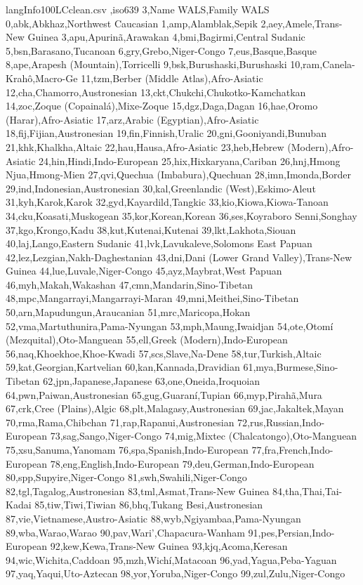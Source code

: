 \begin{filecontents*}{langInfo100LCclean.csv}
,iso639 3,Name WALS,Family WALS
0,abk,Abkhaz,Northwest Caucasian
1,amp,Alamblak,Sepik
2,aey,Amele,Trans-New Guinea
3,apu,Apurinã,Arawakan
4,bmi,Bagirmi,Central Sudanic
5,bsn,Barasano,Tucanoan
6,gry,Grebo,Niger-Congo
7,eus,Basque,Basque
8,ape,Arapesh (Mountain),Torricelli
9,bsk,Burushaski,Burushaski
10,ram,Canela-Krahô,Macro-Ge
11,tzm,Berber (Middle Atlas),Afro-Asiatic
12,cha,Chamorro,Austronesian
13,ckt,Chukchi,Chukotko-Kamchatkan
14,zoc,Zoque (Copainalá),Mixe-Zoque
15,dgz,Daga,Dagan
16,hae,Oromo (Harar),Afro-Asiatic
17,arz,Arabic (Egyptian),Afro-Asiatic
18,fij,Fijian,Austronesian
19,fin,Finnish,Uralic
20,gni,Gooniyandi,Bunuban
21,khk,Khalkha,Altaic
22,hau,Hausa,Afro-Asiatic
23,heb,Hebrew (Modern),Afro-Asiatic
24,hin,Hindi,Indo-European
25,hix,Hixkaryana,Cariban
26,hnj,Hmong Njua,Hmong-Mien
27,qvi,Quechua (Imbabura),Quechuan
28,imn,Imonda,Border
29,ind,Indonesian,Austronesian
30,kal,Greenlandic (West),Eskimo-Aleut
31,kyh,Karok,Karok
32,gyd,Kayardild,Tangkic
33,kio,Kiowa,Kiowa-Tanoan
34,cku,Koasati,Muskogean
35,kor,Korean,Korean
36,ses,Koyraboro Senni,Songhay
37,kgo,Krongo,Kadu
38,kut,Kutenai,Kutenai
39,lkt,Lakhota,Siouan
40,laj,Lango,Eastern Sudanic
41,lvk,Lavukaleve,Solomons East Papuan
42,lez,Lezgian,Nakh-Daghestanian
43,dni,Dani (Lower Grand Valley),Trans-New Guinea
44,lue,Luvale,Niger-Congo
45,ayz,Maybrat,West Papuan
46,myh,Makah,Wakashan
47,cmn,Mandarin,Sino-Tibetan
48,mpc,Mangarrayi,Mangarrayi-Maran
49,mni,Meithei,Sino-Tibetan
50,arn,Mapudungun,Araucanian
51,mrc,Maricopa,Hokan
52,vma,Martuthunira,Pama-Nyungan
53,mph,Maung,Iwaidjan
54,ote,Otomí (Mezquital),Oto-Manguean
55,ell,Greek (Modern),Indo-European
56,naq,Khoekhoe,Khoe-Kwadi
57,scs,Slave,Na-Dene
58,tur,Turkish,Altaic
59,kat,Georgian,Kartvelian
60,kan,Kannada,Dravidian
61,mya,Burmese,Sino-Tibetan
62,jpn,Japanese,Japanese
63,one,Oneida,Iroquoian
64,pwn,Paiwan,Austronesian
65,gug,Guaraní,Tupian
66,myp,Pirahã,Mura
67,crk,Cree (Plains),Algic
68,plt,Malagasy,Austronesian
69,jac,Jakaltek,Mayan
70,rma,Rama,Chibchan
71,rap,Rapanui,Austronesian
72,rus,Russian,Indo-European
73,sag,Sango,Niger-Congo
74,mig,Mixtec (Chalcatongo),Oto-Manguean
75,xsu,Sanuma,Yanomam
76,spa,Spanish,Indo-European
77,fra,French,Indo-European
78,eng,English,Indo-European
79,deu,German,Indo-European
80,spp,Supyire,Niger-Congo
81,swh,Swahili,Niger-Congo
82,tgl,Tagalog,Austronesian
83,tml,Asmat,Trans-New Guinea
84,tha,Thai,Tai-Kadai
85,tiw,Tiwi,Tiwian
86,bhq,Tukang Besi,Austronesian
87,vie,Vietnamese,Austro-Asiatic
88,wyb,Ngiyambaa,Pama-Nyungan
89,wba,Warao,Warao
90,pav,Wari',Chapacura-Wanham
91,pes,Persian,Indo-European
92,kew,Kewa,Trans-New Guinea
93,kjq,Acoma,Keresan
94,wic,Wichita,Caddoan
95,mzh,Wichí,Matacoan
96,yad,Yagua,Peba-Yaguan
97,yaq,Yaqui,Uto-Aztecan
98,yor,Yoruba,Niger-Congo
99,zul,Zulu,Niger-Congo

\end{filecontents*}